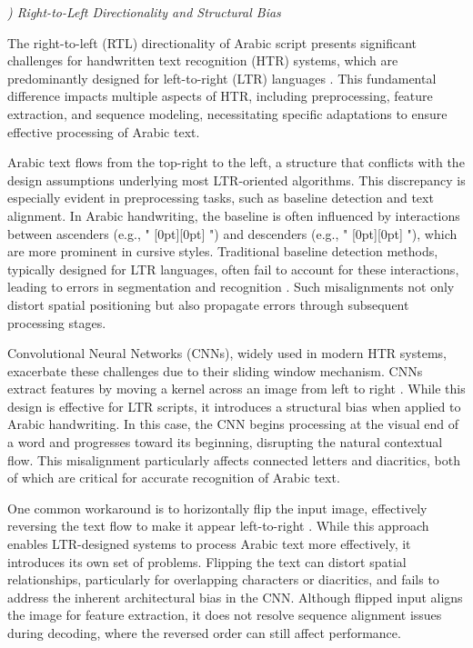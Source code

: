\documentclass[conference]{IEEEtran}
\newcommand{\artext}[1]{%
  {\fontsize{8pt}{11pt}\selectfont \raisebox{0pt}[0pt][0pt]{\RL{#1}}}%
}
\newcounter{customsubsubsection} %
\renewcommand{\subsubsection}[1]{%
  \stepcounter{customsubsubsection}%
  \vspace{0.5em} %
  \textit{\arabic{customsubsubsection}) #1}%
  \vspace{0.5em} %
}
\begin{document}
\subsubsection{Right-to-Left Directionality and Structural Bias}


The right-to-left (RTL) directionality of Arabic script presents significant challenges for handwritten text recognition (HTR) systems, which are predominantly designed for left-to-right (LTR) languages \cite{abdulmuttalib2021rtl}. This fundamental difference impacts multiple aspects of HTR, including preprocessing, feature extraction, and sequence modeling, necessitating specific adaptations to ensure effective processing of Arabic text.


Arabic text flows from the top-right to the left, a structure that conflicts with the design assumptions underlying most LTR-oriented algorithms. This discrepancy is especially evident in preprocessing tasks, such as baseline detection and text alignment. In Arabic handwriting, the baseline is often influenced by interactions between ascenders (e.g., "\artext{ط}") and descenders (e.g., "\artext{ي}"), which are more prominent in cursive styles. Traditional baseline detection methods, typically designed for LTR languages, often fail to account for these interactions, leading to errors in segmentation and recognition \cite{khattab2019arabic}. Such misalignments not only distort spatial positioning but also propagate errors through subsequent processing stages.


Convolutional Neural Networks (CNNs), widely used in modern HTR systems, exacerbate these challenges due to their sliding window mechanism. CNNs extract features by moving a kernel across an image from left to right \cite{lecun1998gradient}. While this design is effective for LTR scripts, it introduces a structural bias when applied to Arabic handwriting. In this case, the CNN begins processing at the visual end of a word and progresses toward its beginning, disrupting the natural contextual flow. This misalignment particularly affects connected letters and diacritics, both of which are critical for accurate recognition of Arabic text.

One common workaround is to horizontally flip the input image, effectively reversing the text flow to make it appear left-to-right \cite{saeed2024muharaf, chan2024hatformer}. While this approach enables LTR-designed systems to process Arabic text more effectively, it introduces its own set of problems. Flipping the text can distort spatial relationships, particularly for overlapping characters or diacritics, and fails to address the inherent architectural bias in the CNN. Although flipped input aligns the image for feature extraction, it does not resolve sequence alignment issues during decoding, where the reversed order can still affect performance.
\end{document}
